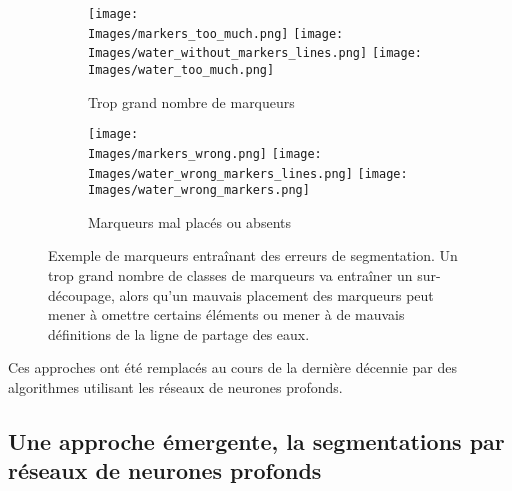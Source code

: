 \documentclass[\main/main.tex]{subfiles}
\providecommand{\Images}{\main/Figures/intro_seg}
\begin{document}
\begin{figure}[h!]
    \begin{subfigure}[b]{\textwidth}
       \caption{
           \label{fig:watershed:errors:quantite}
            Trop grand nombre de marqueurs
            }
       \centering \texttt{[image: \\Images/markers\_too\_much.png]} \texttt{[image: \\Images/water\_without\_markers\_lines.png]}
       \centering \texttt{[image: \\Images/water\_too\_much.png]}
    \end{subfigure}
    \begin{subfigure}[b]{\textwidth}
       \caption{
           \label{fig:watershed:errors:position}
            Marqueurs mal placés ou absents
            }
       \centering \texttt{[image: \\Images/markers\_wrong.png]} \texttt{[image: \\Images/water\_wrong\_markers\_lines.png]}
       \centering \texttt{[image: \\Images/water\_wrong\_markers.png]}
       \centering
    \end{subfigure}
    \caption{
        Exemple de marqueurs entraînant des erreurs de segmentation.\newline
        Un trop grand nombre de classes de marqueurs va entraîner un sur\hyp{}découpage, alors qu'un mauvais placement des marqueurs peut mener à omettre certains éléments ou mener à de mauvais définitions de la ligne de partage des eaux.
    }
    
\end{figure}

%
Ces approches ont été remplacés au cours de la dernière décennie par des algorithmes utilisant les réseaux de neurones profonds.

    \subsection{Une approche émergente, la segmentations par réseaux de neurones profonds}
\end{document}
